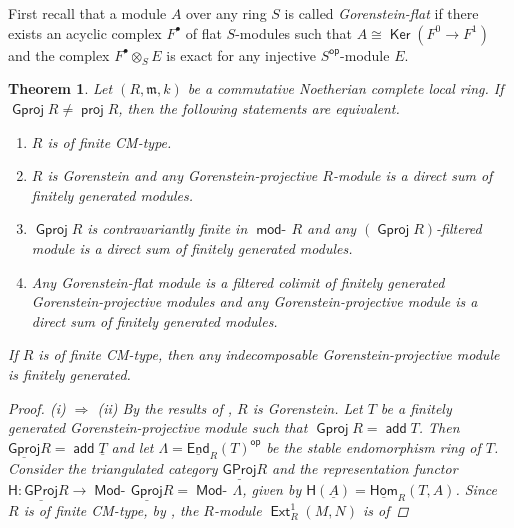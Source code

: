 \documentclass[oneside, a4paper,reqno]{amsart}
\numberwithin{equation}{section}
\newtheorem{thm}{Theorem}[section]
\theoremstyle{definition}
\begin{document}
First recall that a module $A$ over any ring $S$ is called {\em
Gorenstein-flat} if there exists an acyclic complex $F^{\bullet}$ of
flat $S$-modules such that $A \cong \operatorname*{\mathsf{Ker}}(F^{0} {\longrightarrow} F^{1})$ and the
complex $F^{\bullet}\otimes_{S}E$ is exact for any injective
$S^\operatorname*{\mathsf{op}}$-module $E$.

\begin{thm} Let $(R,\mathfrak{m},k)$ be a commutative Noetherian complete local ring. If ${\operatorname{\mathsf{Gproj}}\nolimits} R \neq \operatorname*{\mathsf{proj}}
R$, then the following statements are equivalent.
\begin{enumerate}
\item $R$ is of finite CM-type.
\item $R$ is Gorenstein and any Gorenstein-projective $R$-module is a direct sum of finitely
generated modules.
\item ${\operatorname{\mathsf{Gproj}}\nolimits} R$ is contravariantly finite in $\operatorname*{\mathsf{mod}-\!} R$ and any
$({\operatorname{\mathsf{Gproj}}\nolimits} R)$-filtered module is a direct sum of finitely generated
modules.
\item Any Gorenstein-flat module is a filtered colimit of finitely generated Gorenstein-projective modules and any Gorenstein-projective
module is a direct sum of finitely generated modules.
\end{enumerate}
If $R$ is of finite CM-type, then any indecomposable
Gorenstein-projective module is finitely generated.
\begin{proof} (i) $\Rightarrow$ (ii) By the results of \cite{CPST}, $R$ is Gorenstein. Let $T$ be a finitely generated
Gorenstein-projective module such that ${\operatorname{\mathsf{Gproj}}\nolimits} R = \operatorname*{\mathsf{add}} T$.  Then
${\operatorname{\underline{\mathsf{Gproj}}}\nolimits} R = \operatorname*{\mathsf{add}} \underline{T}$ and let $\Lambda =
\operatorname*{\underline{\mathsf{End}}}_{R}(T)^\operatorname*{\mathsf{op}}$ be the stable endomorphism ring of $T$. Consider
the triangulated category ${\operatorname{\underline{\mathsf{GProj}}}\nolimits} R$ and the representation functor
$\mathsf{H} : {\operatorname{\underline{\mathsf{GProj}}}\nolimits} R {\longrightarrow} \operatorname*{\mathsf{Mod}-\!}{\operatorname{\underline{\mathsf{Gproj}}}\nolimits} R = \operatorname*{\mathsf{Mod}-\!} \Lambda$, given by
$\mathsf{H}({\underline A}) = \operatorname*{\underline{\mathsf{Hom}}}_{R}(T,A)$. Since $R$ is of finite CM-type,
by \cite[Lemma 4.1]{CPST}, the $R$-module $\operatorname*{\mathsf{Ext}}^{1}_{R}(M,N)$ is of

\end{proof}
\end{thm}
\end{document}
